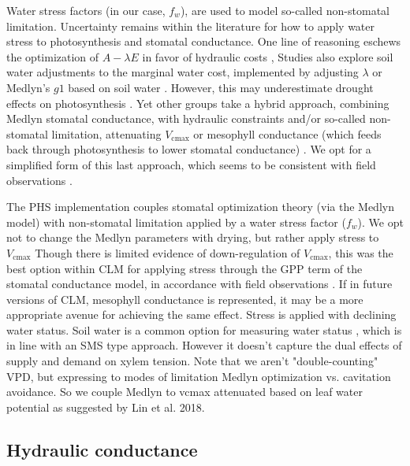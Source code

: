 \documentclass[draft,linenumbers]{agujournal}
\begin{document}
Water stress factors (in our case, $f_w$), are used to model so-called non-stomatal limitation. 
Uncertainty remains within the literature for how to apply water stress to photosynthesis and stomatal conductance.
One line of reasoning eschews the optimization of $A-\lambda E$ in favor of hydraulic costs \citep{sperry2017},
Studies also explore soil water adjustments to the marginal water cost, implemented by adjusting $\lambda$ or Medlyn's $g1$ based on soil water \citep{manzoni2013b}.
However, this may underestimate drought effects on photosynthesis \citep{zhou2013,lin2018}.
Yet other groups take a hybrid approach, combining Medlyn stomatal conductance, with hydraulic constraints and/or 
so-called non-stomatal limitation, attenuating $V_{\text{cmax}}$ or mesophyll conductance
(which feeds back through photosynthesis to lower stomatal conductance) \citep{egea2011,novick2016a}.
We opt for a simplified form of this last approach, which seems to be consistent with field observations \citep{lin2018}.

The PHS implementation couples stomatal optimization theory (via the Medlyn model) with 
non-stomatal limitation applied by a water stress factor ($f_w$).
We opt not to change the Medlyn parameters with drying, but rather apply stress to $V_{\text{cmax}}$
Though there is limited evidence of down-regulation of $V_{\text{cmax}}$, this was the best option within CLM 
for applying stress through the GPP term of the stomatal conductance model, in accordance with field observations \citep{lin2018,zhou2013}.
If in future versions of CLM, mesophyll conductance is represented, it may be a more appropriate avenue for achieving the same effect.
Stress is applied with declining water status.
Soil water is a common option for measuring water status \citep{drake2017}, which is in line with an SMS type approach.
However it doesn't capture the dual effects of supply and demand on xylem tension.
Note that we aren't "double-counting" VPD, but expressing to modes of limitation Medlyn optimization vs. cavitation avoidance.
So we couple Medlyn to vcmax attenuated based on leaf water potential as suggested by Lin et al. 2018.

\subsection{Hydraulic conductance}
\end{document}
